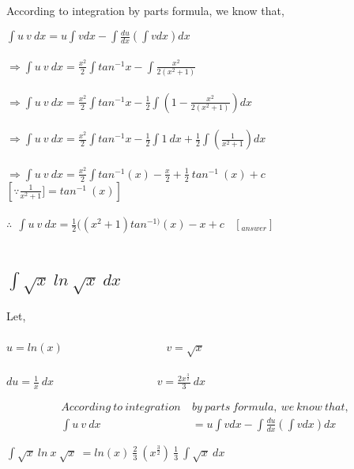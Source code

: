 \documentclass[12pt]{article}%
\begin{document}
According to integration by parts formula, we know that, \par \par
$ \int u\:v\: dx = u\int vdx - \int \frac{du}{dx}(\int vdx) dx $ \\\\
$\Rightarrow \int u\:v\:dx = \frac{x^{2}}{2} \int tan^{-1}x - \int \frac{x^2}{2(x^2+1)} $ \\\\
$\Rightarrow \int u\:v\:dx = \frac{x^{2}}{2} \int tan^{-1}x - \frac{1}{2}\int (1-\frac{x^2}{2(x^2+1)}) dx $ \\\\
$\Rightarrow \int u \:v\:dx = \frac{x^{2}}{2} \int tan^{-1}x - \frac{1}{2} \int 1 \: dx + \frac{1}{2} \int (\frac{1}{x^2+1}) dx$\\\\
$\Rightarrow \int u \:v\:dx = \frac{x^{2}}{2} \int tan^{-1}(x) - \frac{x}{2} + \frac{1}{2} \: tan^{-1}\:(x) + c$  \ \ \ \ \ \ \ \ \  $\left [ \because \frac{1}{x^2+1}] = tan^{-1} \:(x) \right ]$\\\\
$\therefore \: \: \int u \:v\:dx = \frac{1}{2} ((x^2+1)tan^{-1)}(x) - x +c \ \ \ \  \left[_{answer}\right]$ \\\\

\pagebreak

\subsection{$\int \sqrt{x} \: ln \: \sqrt{x}\:dx$}


Let, \\\\
$u=ln(x)$ \ \ \ \ \ \ \ \ \ \ \ \ \ \ \ \ \ \ $v= \sqrt{x}$ \\\\
$du = \frac{1}{x} \: dx$ \ \ \ \ \ \ \ \ \ \ \ \ \ \ \ \ \ \ $v=\frac{2x^{\frac{3}{2}}}{3} \:dx$

\begin{align*}
    According \: to \ integration \ &by \ parts \ formula, \ we \ know \ that,\\
    \int u\:v\: dx &= u\int vdx - \int \frac{du}{dx}(\int vdx) dx 
\end{align*}


 $\int \sqrt{x} \: ln\:x \: \sqrt{x} \: = ln(x)\: \frac{2}{3}\:(x^{\frac{3}{2}}) \: \frac{1}{3} \: \int \sqrt{x} \: dx $ \\ 
 
\end{document}

